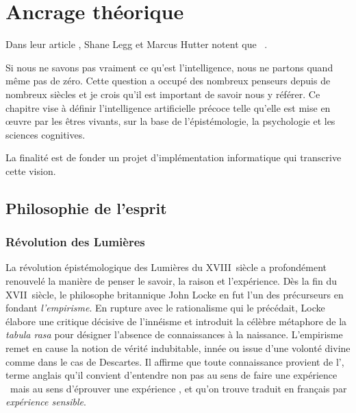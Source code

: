 \chapter{Ancrage théorique}

\noindent 
Dans leur article \og {} \fg, Shane Legg et Marcus Hutter notent que \og {} \fg\ \cite[p.~1]{legg_universal_2007}.

Si nous ne savons pas vraiment ce qu'est l'intelligence, nous ne partons quand même pas de zéro. 
Cette question a occupé des nombreux penseurs depuis de nombreux siècles et je crois qu'il est important de savoir nous y référer. 
Ce chapitre vise à définir l'intelligence artificielle précoce telle qu'elle est mise en \oe uvre par les êtres vivants, sur la base de l'épistémologie, la psychologie et les sciences cognitives. 

La finalité est de fonder un projet d'implémentation informatique qui transcrive cette vision.

\section{Philosophie de l'esprit}


\subsection{Révolution des Lumières}
\label{sec:limieres}

\noindent
La révolution épistémologique des Lumières du XVIII\ieme{}~siècle a profondément renouvelé la manière de penser le savoir, la raison et l’expérience.
Dès la fin du XVII\ieme{}~siècle, le philosophe britannique John Locke en fut l'un des précurseurs en fondant \emph{l'empirisme}. 
En rupture avec le rationalisme qui le précédait, Locke élabore une critique décisive de l'innéisme et introduit la célèbre métaphore de la \emph{tabula rasa} pour désigner l’absence de connaissances à la naissance.
L'empirisme remet en cause la notion de vérité indubitable, innée ou issue d'une volonté divine comme dans le cas de Descartes. 
Il affirme que toute connaissance provient de l', terme anglais qu'il convient d'entendre non pas au sens de \og faire une expérience \fg\ mais au sens \og d'éprouver une expérience \fg, et qu'on trouve traduit en français par \emph{expérience sensible}.

